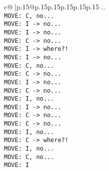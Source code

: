 \documentclass{article}
\begin{document}
{\begin{supertabular}{c@{$\;$}|p{.15\linewidth}@{}p{.15\linewidth}p{.15\linewidth}p{.15\linewidth}p{.15\linewidth}p{.15\linewidth}}
{{{..\\ \tt  MOVE: C, no...\\ \tt  MOVE: I -> no...\\ \tt  MOVE: I -> no...\\ \tt  MOVE: C -> no...\\ \tt  MOVE: I -> where?!\\ \tt  MOVE: I -> no...\\ \tt  MOVE: C, no...\\ \tt  MOVE: C -> no...\\ \tt  MOVE: I -> no...\\ \tt  MOVE: C -> no...\\ \tt  MOVE: I, no...\\ \tt  MOVE: I -> no...\\ \tt  MOVE: C -> no...\\ \tt  MOVE: C -> no...\\ \tt  MOVE: I, no...\\ \tt  MOVE: C -> where?!\\ \tt  MOVE: I, no...\\ \tt  MOVE: C, no...\\ \tt  MOVE: I}}}
\end{supertabular}}
\end{document}
